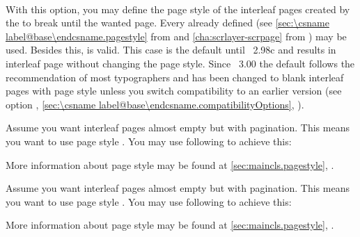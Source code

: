 \begin{Declaration}
  \\
\end{Declaration}%
%
%
With this option, you may define the page style of the
interleaf pages created by the  to break until the
wanted page. Every already defined  (see
\autoref{sec:\csname label@base\endcsname.pagestyle} from
 and
\autoref{cha:scrlayer-scrpage} from ) may be
used. Besides this,  is valid. This case
is the default until \KOMAScript~2.98c and results in interleaf page without
changing the page style. Since
\KOMAScript~3.00 the default follows the
recommendation of most typographers and has been changed to blank interleaf
pages with page style  unless you switch compatibility to an
earlier version (see option , \autoref{sec:\csname
  label@base\endcsname.compatibilityOptions}, ).  \ifCommonmaincls
\begin{Example}
  \label{desc:maincls.option.cleardoublepage.example}
  Assume you want interleaf pages almost empty but with pagination. This
  means you want to use page style . You may use following to
  achieve this:
\begin{lstcode}
\end{lstcode}
  More information about page style  may be found at
  \autoref{sec:maincls.pagestyle}, .
\end{Example}
\fi
\ifCommonscrextend
\begin{Example}
  \label{desc:scrextend.option.cleardoublepage.example}
  Assume you want interleaf pages almost empty but with pagination. This
  means you want to use page style . You may use following to
  achieve this:
\begin{lstcode}
\end{lstcode}
  More information about page style  may be found at
  \autoref{sec:maincls.pagestyle}, .
\end{Example}
\fi
{}%


